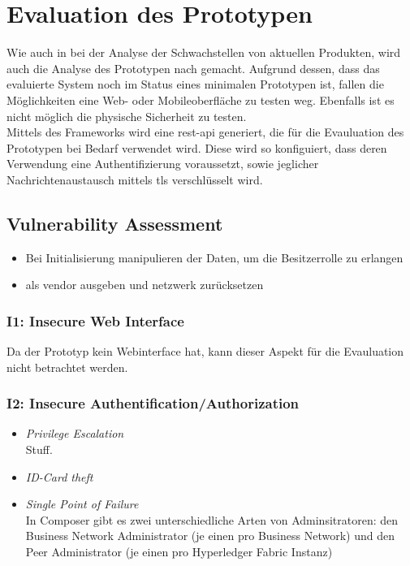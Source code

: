 \section{Evaluation des Prototypen}
\label{sec:evaluation}
    Wie auch in  bei der Analyse der Schwachstellen von aktuellen Produkten, wird auch die Analyse des Prototypen nach \cite{Miessler} gemacht. 
    Aufgrund dessen, dass das evaluierte System noch im Status eines minimalen Prototypen ist, fallen die Möglichkeiten eine Web- oder Mobileoberfläche zu testen weg. 
    Ebenfalls ist es nicht möglich die physische Sicherheit zu testen.
    \medskip\\
    Mittels des Frameworks wird eine \gls{rest}-\gls{api} generiert, die für die Evauluation des Prototypen bei Bedarf verwendet wird. 
    Diese wird so konfiguiert, dass deren Verwendung eine Authentifizierung voraussetzt, sowie jeglicher Nachrichtenaustausch mittels \gls{tls} verschlüsselt wird.

    \subsection{Vulnerability Assessment}
        \begin{itemize}[noitemsep]
            \item Bei Initialisierung manipulieren der Daten, um die Besitzerrolle zu erlangen
            \item als vendor ausgeben und netzwerk zurücksetzen
        \end{itemize}
    
        \subsubsection*{I1: Insecure Web Interface}
            Da der Prototyp kein Webinterface hat, kann dieser Aspekt für die Evauluation nicht betrachtet werden.
           
        \subsubsection*{I2: Insecure Authentification/Authorization}
            \begin{itemize}[leftmargin=0cm,label={}]
                \item \emph{Privilege Escalation}\label{vuln:prototype_pe}\\
        	        Stuff.
    	        \item \emph{ID-Card theft}
    	        \item \emph{Single Point of Failure}\label{vuln:prototype_spf}\\
                    In Composer gibt es zwei unterschiedliche Arten von Adminsitratoren: den Business Network Administrator (je einen pro Business Network) und den Peer Administrator (je einen pro Hyperledger Fabric Instanz)
            \end{itemize}
            
